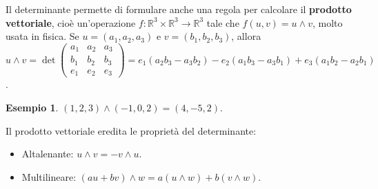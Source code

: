 \documentclass[a4paper]{article}
\theoremstyle{definition}
\newtheorem*{es}{Esempio}
\begin{document}
Il determinante permette di formulare anche una regola per calcolare il \textbf{prodotto vettoriale},
cioè un'operazione $f: \mathbb{R}^3 \times \mathbb{R}^3 \rightarrow \mathbb{R}^3$ tale che $f(u, v) = u \wedge v$, molto usata in fisica.
Se $u = (a_1, a_2, a_3)$ e $v = (b_1, b_2, b_3)$, allora $u \wedge v = \det \begin{pmatrix}
		a_1 & a_2 & a_3 \\
		b_1 & b_2 & b_3 \\
		e_1 & e_2 & e_3
	\end{pmatrix} = e_1(a_2b_3 - a_3b_2) - e_2(a_1b_3 - a_3b_1) + e_3(a_1b_2 - a_2b_1)$.
\begin{es}
	$(1, 2, 3) \wedge (-1, 0, 2) = (4, -5, 2)$.
\end{es}
Il prodotto vettoriale eredita le proprietà del determinante:
\begin{itemize}
	\item Altalenante: $u \wedge v = - v \wedge u$.
	\item Multilineare: $(au + bv) \wedge w = a(u \wedge w) + b(v \wedge w)$.
\end{itemize}
\end{document}
